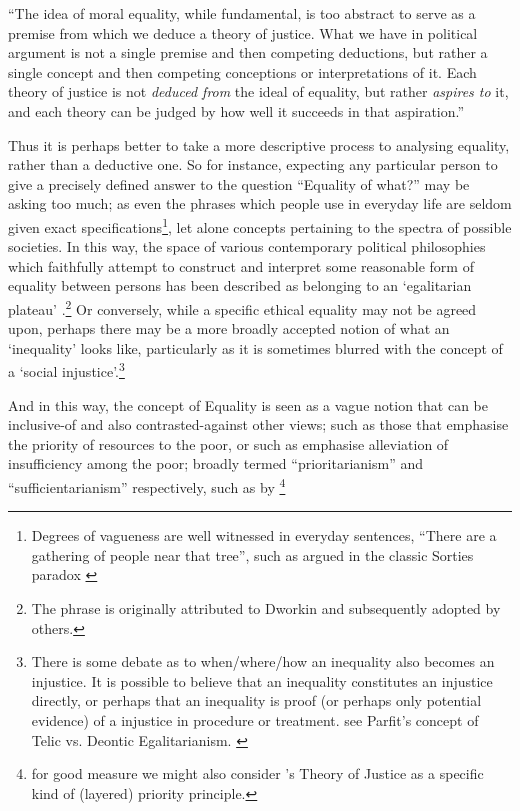 \begin{displayquote}
``The idea of moral equality, while fundamental, is too abstract to serve as a premise from which we deduce a theory of justice. What we have in political argument is not a single premise and then competing deductions, but rather a single concept and then competing conceptions or interpretations of it. Each theory of justice is not \textit{deduced from} the ideal of equality, but rather \textit{aspires to} it, and each theory can be judged by how well it succeeds in that aspiration.'' \citep{kymlicka2002contemporary}
\end{displayquote}

Thus it is perhaps better to take a more descriptive process to analysing equality, rather than a deductive one.
So for instance, expecting any particular person to give a precisely defined answer to the question ``Equality of what?'' may be asking too much; as even the phrases which people use in everyday life are seldom given exact specifications\footnote{Degrees of vagueness are well witnessed in everyday sentences, ``There are a gathering of people near that tree'', such as argued in the classic Sorties paradox \citep{frances_2018}}, let alone concepts pertaining to the spectra of possible societies.
In this way, the space of various contemporary political philosophies which faithfully attempt to construct and interpret some reasonable form of equality between persons has been described as belonging to an `egalitarian plateau' \citep{Brown2007}.\footnote{The phrase is originally attributed to Dworkin and subsequently adopted by others.}
Or conversely, while a specific ethical equality may not be agreed upon, perhaps there may be a more broadly accepted notion of what an `inequality' looks like,
particularly as it is sometimes blurred with the concept of a `social injustice'.\footnote{There is some debate as to when/where/how an inequality also becomes an injustice. It is possible to believe that an inequality constitutes an injustice directly, or perhaps that an inequality is proof (or perhaps only potential evidence) of a injustice in procedure or treatment. see Parfit's concept of Telic vs. Deontic Egalitarianism. \citep{equalityandpriorityparfit}}

And in this way, the concept of Equality is seen as a vague notion that can be inclusive-of and also contrasted-against other views; such as those that emphasise the priority of resources to the poor, or such as emphasise alleviation of insufficiency among the poor; broadly termed ``prioritarianism'' and ``sufficientarianism'' respectively, such as by \cite{sep-egalitarianism}\footnote{for good measure we might also consider \cite{rawls2005theory}'s Theory of Justice  as a specific kind of (layered) priority principle.}

